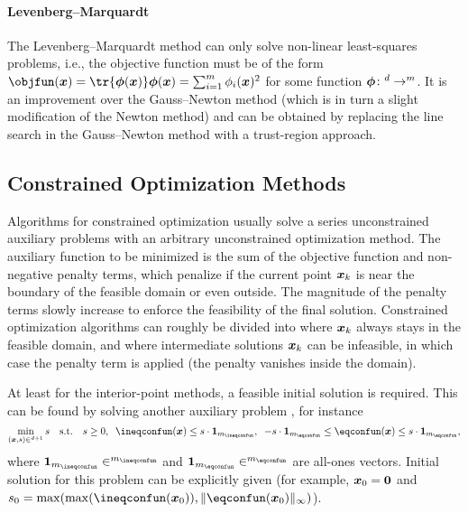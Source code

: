 \paragraph{Levenberg--Marquardt}

The Levenberg--Marquardt method
can only solve non-linear least-squares problems, i.e.,
the objective function must be of the form
$\objfun(\*x) = \tr{\*\phi(\*x)} \*\phi(\*x) = \sum_{i=1}^m \phi_i(\*x)^2$
for some function $\*\phi\colon \real^d \to \real^m$.
It is an improvement over the Gauss--Newton method
(which is in turn a slight modification of the Newton method)
and can be obtained by replacing the line search in the
Gauss--Newton method with a trust-region approach.



\subsection{Constrained Optimization Methods}
\label{sec:513gradientBasedConstrained}

Algorithms for constrained optimization usually
solve a series unconstrained auxiliary problems with an arbitrary
unconstrained optimization method.
The auxiliary function to be minimized is
the sum of the objective function and non-negative penalty terms,
which penalize if the current point ${\boldsymbol{x}}_k$ is near the boundary
of the feasible domain or even outside.
The magnitude of the penalty terms slowly increase to enforce
the feasibility of the final solution.
Constrained optimization algorithms can roughly be divided
into 
where ${\boldsymbol{x}}_k$ always stays in the feasible domain,
and 
where intermediate solutions ${\boldsymbol{x}}_k$ can be infeasible,
in which case the penalty term is applied
(the penalty vanishes inside the domain).

At least for the interior-point methods,
a feasible initial solution is required.
This can be found by solving another auxiliary problem
\cite{Toussaint15Introduction}, for instance
\begin{equation}
  \min_{(\*x, s) \in \real^{d+1}} s
  \quad\text{s.t.}\quad
  s \ge 0,\;\;
  \ineqconfun(\*x) \le s \cdot \*1_{m_{\ineqconfun}},\;\;
  -s \cdot \*1_{m_{\eqconfun}} \le \eqconfun(\*x) \le s \cdot \*1_{m_{\eqconfun}},
\end{equation}
where $\*1_{m_{\ineqconfun}} \in \real^{m_{\ineqconfun}}$ and
$\*1_{m_{\eqconfun}} \in \real^{m_{\eqconfun}}$ are all-ones vectors.
Initial solution for this problem can be explicitly given
(for example, ${\boldsymbol{x}}_0 = {\boldsymbol{0}}$ and
$s_0 = \max(\max(\ineqconfun(\*x_0)), \norm[\infty]{\eqconfun(\*x_0)})$).

